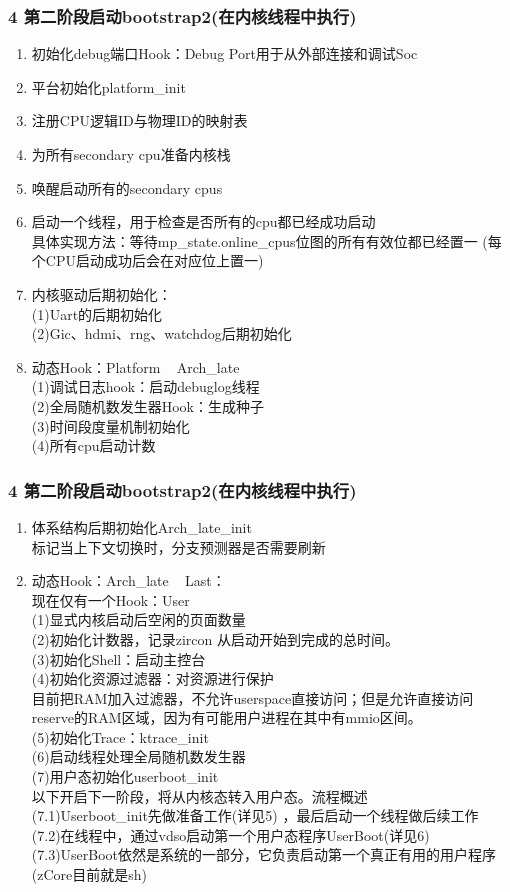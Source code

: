 \documentclass[
8pt, %
]{beamer}
\begin{document}
	\begin{frame}
		\frametitle{4 第二阶段启动bootstrap2(在内核线程中执行)}
		\begin{enumerate}
			\item 初始化debug端口Hook：Debug Port用于从外部连接和调试Soc
			\item 平台初始化platform\_init
			\item 注册CPU逻辑ID与物理ID的映射表
			\item 为所有secondary cpu准备内核栈
			\item 唤醒启动所有的secondary cpus
			\item 启动一个线程，用于检查是否所有的cpu都已经成功启动\\
			具体实现方法：等待mp\_state.online\_cpus位图的所有有效位都已经置一 (每个CPU启动成功后会在对应位上置一)
			\item 内核驱动后期初始化：\\
			(1)Uart的后期初始化\\
			(2)Gic、hdmi、rng、watchdog后期初始化
			\item 动态Hook：Platform ~ Arch\_late\\
			(1)调试日志hook：启动debuglog线程\\
			(2)全局随机数发生器Hook：生成种子\\
			(3)时间段度量机制初始化\\
			(4)所有cpu启动计数
		\end{enumerate}
	\end{frame}

	\begin{frame}
		\frametitle{4 第二阶段启动bootstrap2(在内核线程中执行)}
		\begin{enumerate}
			\item 体系结构后期初始化Arch\_late\_init\\
			标记当上下文切换时，分支预测器是否需要刷新
			\item 动态Hook：Arch\_late ~ Last：\\
			现在仅有一个Hook：User\\
			(1)显式内核启动后空闲的页面数量\\
			(2)初始化计数器，记录zircon 从启动开始到完成的总时间。\\
			(3)初始化Shell：启动主控台\\
			(4)初始化资源过滤器：对资源进行保护\\
			目前把RAM加入过滤器，不允许userspace直接访问；但是允许直接访问reserve的RAM区域，因为有可能用户进程在其中有mmio区间。\\
			(5)初始化Trace：ktrace\_init\\
			(6)启动线程处理全局随机数发生器\\
			(7)用户态初始化userboot\_init\\
			以下开启下一阶段，将从内核态转入用户态。流程概述\\
			(7.1)Userboot\_init先做准备工作(详见5) ，最后启动一个线程做后续工作\\
			(7.2)在线程中，通过vdso启动第一个用户态程序UserBoot(详见6)\\
			(7.3)UserBoot依然是系统的一部分，它负责启动第一个真正有用的用户程序(zCore目前就是sh)
		\end{enumerate}
	\end{frame}
\end{document}
